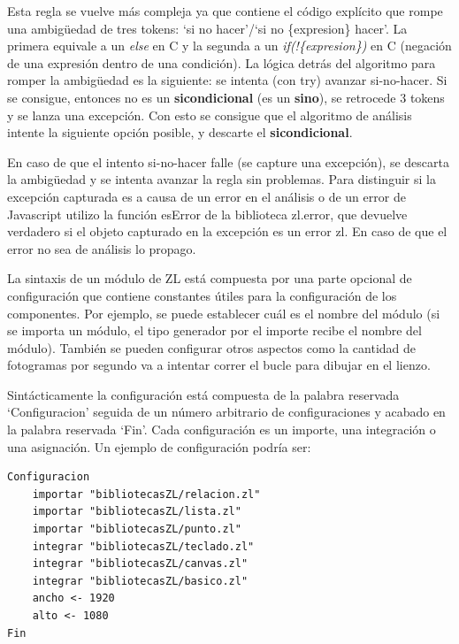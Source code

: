 \documentclass{report}
\begin{document}
	Esta regla se vuelve más compleja ya que contiene el código explícito que rompe una ambigüedad de tres tokens: `si no hacer'/`si no \{expresion\} hacer'. La primera equivale a un \textit{else} en C y la segunda a un \textit{if(!\{expresion\})} en C (negación de una expresión dentro de una condición). La lógica detrás del algoritmo para romper la ambigüedad es la siguiente: se intenta (con try) avanzar si-no-hacer. Si se consigue, entonces no es un \textbf{sicondicional} (es un \textbf{sino}), se retrocede 3 tokens y se lanza una excepción. Con esto se consigue que el algoritmo de análisis intente la siguiente opción posible, y descarte el \textbf{sicondicional}. 
	
	\vspace{10px}
	
	En caso de que el intento si-no-hacer falle (se capture una excepción), se descarta la ambigüedad y se intenta avanzar la regla sin problemas. Para distinguir si la excepción capturada es a causa de un error en el análisis o de un error de Javascript utilizo la función esError de la biblioteca zl.error, que devuelve verdadero si el objeto capturado en la excepción es un error zl. En caso de que el error no sea de análisis lo propago.
	
	
	\vspace{10px}
	
	La sintaxis de un módulo de ZL está compuesta por una parte opcional de configuración que contiene constantes útiles para la configuración de los componentes. Por ejemplo, se puede establecer cuál es el nombre del módulo (si se importa un módulo, el tipo generador por el importe recibe el nombre del módulo). También se pueden configurar otros aspectos como la cantidad de fotogramas por segundo va a intentar correr el bucle para dibujar en el lienzo. 
	
	Sintácticamente la configuración está compuesta de la palabra reservada `Configuracion' seguida de un número arbitrario de configuraciones y acabado en la palabra reservada `Fin'. Cada configuración es un importe, una integración o una asignación. Un ejemplo de configuración podría ser:
	
	\begin{BVerbatim}
Configuracion
	importar "bibliotecasZL/relacion.zl"
	importar "bibliotecasZL/lista.zl"
	importar "bibliotecasZL/punto.zl"
	integrar "bibliotecasZL/teclado.zl"
	integrar "bibliotecasZL/canvas.zl"
	integrar "bibliotecasZL/basico.zl"
	ancho <- 1920
	alto <- 1080
Fin
	\end{BVerbatim}
	
\end{document}
